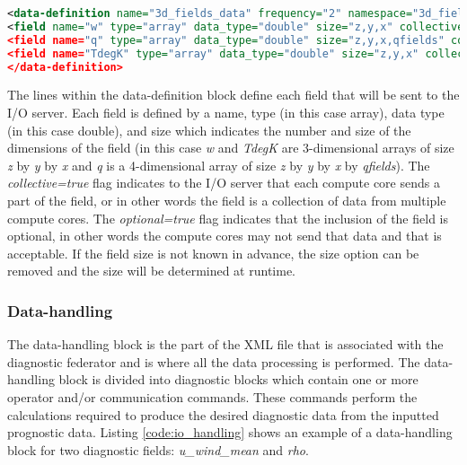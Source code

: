 \begin{lstlisting}[language=XML,caption=Example of MONC I/O data-definition block used to define what data the I/O server will receive from the compute cores. The frequency variable indicates at what timestep frequency the compute cores will send data to the I/O server and the field name variable indicates the name of the data to be sent from the compute cores.,label={code:io_fields}]
<data-definition name="3d_fields_data" frequency="2" namespace="3d_fieldsns">
<field name="w" type="array" data_type="double" size="z,y,x" collective=true optional=true/>
<field name="q" type="array" data_type="double" size="z,y,x,qfields" collective=true optional=true/>
<field name="TdegK" type="array" data_type="double" size="z,y,x" collective=true optional=true/>
</data-definition>
\end{lstlisting}

The lines within the data-definition block define each field that will be sent to the I/O server. Each field is defined by a name, type (in this case array), data type (in this case double), and size which indicates the number and size of the dimensions of the field (in this case \textit{w} and \textit{TdegK} are 3-dimensional arrays of size \textit{z} by \textit{y} by \textit{x} and \textit{q} is a 4-dimensional array of size \textit{z} by \textit{y} by \textit{x} by \textit{qfields}). The \textit{collective=true} flag indicates to the I/O server that each compute core sends a part of the field, or in other words the field is a collection of data from multiple compute cores. The \textit{optional=true} flag indicates that the inclusion of the field is optional, in other words the compute cores may not send that data and that is acceptable. If the field size is not known in advance, the size option can be removed and the size will be determined at runtime. \citep{brown2018,moncCode}

\subsubsection{Data-handling}
The data-handling block is the part of the XML file that is associated with the diagnostic federator and is where all the data processing is performed. The data-handling block is divided into diagnostic blocks which contain one or more operator and/or communication commands. These commands perform the calculations required to produce the desired diagnostic data from the inputted prognostic data. Listing \ref{code:io_handling} shows an example of a data-handling block for two diagnostic fields: \textit{u\_wind\_mean} and \textit{rho}. \citep{brown2018,moncCode}

